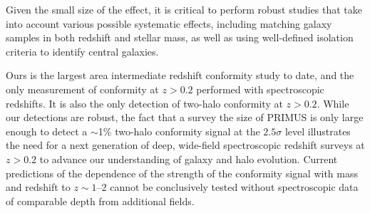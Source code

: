 Given the small size of the effect, it is critical to perform robust studies that take into account various possible 
systematic effects, including matching galaxy samples in both redshift and 
stellar mass, as well as using well-defined isolation criteria to identify central galaxies.

Ours is the largest area intermediate redshift conformity study to date, 
and the only measurement of conformity at $z>0.2$ performed 
with spectroscopic redshifts.
It is also the only detection of two-halo conformity at $z>0.2$.  
While our detections are robust, the fact that a survey the size of 
PRIMUS is only large enough to detect a $\sim$1\% two-halo conformity signal 
at the $2.5\sigma$ level illustrates the need for a next generation of 
deep, wide-field spectroscopic redshift surveys at $z>0.2$ to advance our understanding of galaxy and halo evolution.
Current predictions of the dependence of the strength of the conformity 
signal with mass and redshift to $z\sim1$--2 cannot be conclusively tested 
without spectroscopic data of comparable depth from additional fields.

